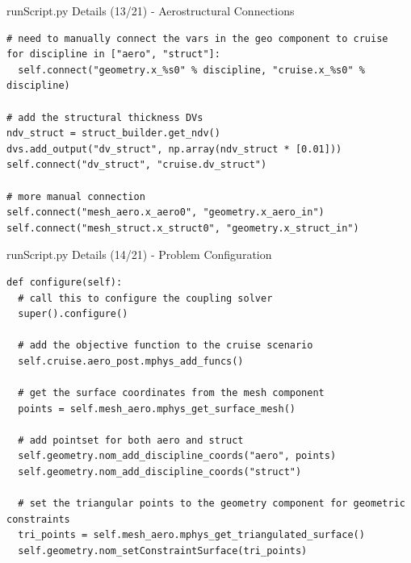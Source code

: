 \documentclass{bredelebeamer}
\begin{document}
\begin{frame}[fragile]{runScript.py Details (13/21) - \large Aerostructural Connections}
\scriptsize
\lstset{ language=bash }
\begin{lstlisting}
# need to manually connect the vars in the geo component to cruise
for discipline in ["aero", "struct"]:
  self.connect("geometry.x_%s0" % discipline, "cruise.x_%s0" % discipline)

# add the structural thickness DVs
ndv_struct = struct_builder.get_ndv()
dvs.add_output("dv_struct", np.array(ndv_struct * [0.01]))
self.connect("dv_struct", "cruise.dv_struct")

# more manual connection
self.connect("mesh_aero.x_aero0", "geometry.x_aero_in")
self.connect("mesh_struct.x_struct0", "geometry.x_struct_in")
\end{lstlisting}
\normalsize
\end{frame}

\begin{frame}[fragile]{runScript.py Details (14/21) - \large Problem Configuration}
\scriptsize
\lstset{ language=bash }
\begin{lstlisting}
def configure(self):
  # call this to configure the coupling solver
  super().configure()

  # add the objective function to the cruise scenario
  self.cruise.aero_post.mphys_add_funcs()

  # get the surface coordinates from the mesh component
  points = self.mesh_aero.mphys_get_surface_mesh()

  # add pointset for both aero and struct
  self.geometry.nom_add_discipline_coords("aero", points)
  self.geometry.nom_add_discipline_coords("struct")

  # set the triangular points to the geometry component for geometric constraints
  tri_points = self.mesh_aero.mphys_get_triangulated_surface()
  self.geometry.nom_setConstraintSurface(tri_points)
\end{lstlisting}
\normalsize
\end{frame}
\end{document}

